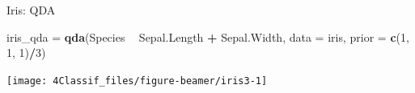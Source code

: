 \documentclass[10pt,ignorenonframetext,]{beamer}
\newenvironment{Shaded}{\begin{snugshade}}{\end{snugshade}}
\newcommand{\KeywordTok}[1]{\textcolor[rgb]{0.13,0.29,0.53}{\textbf{#1}}}
\newcommand{\DataTypeTok}[1]{\textcolor[rgb]{0.13,0.29,0.53}{#1}}
\newcommand{\DecValTok}[1]{\textcolor[rgb]{0.00,0.00,0.81}{#1}}
\newcommand{\StringTok}[1]{\textcolor[rgb]{0.31,0.60,0.02}{#1}}
\newcommand{\OperatorTok}[1]{\textcolor[rgb]{0.81,0.36,0.00}{\textbf{#1}}}
\newcommand{\NormalTok}[1]{#1}
\begin{document}
\begin{frame}[fragile]

\begin{block}{Iris: QDA}

\scriptsize

\begin{Shaded}
\begin{Highlighting}[]
\NormalTok{iris_qda =}\StringTok{ }\KeywordTok{qda}\NormalTok{(Species }\OperatorTok{~}\StringTok{ }\NormalTok{Sepal.Length }\OperatorTok{+}\StringTok{ }\NormalTok{Sepal.Width, }\DataTypeTok{data =}\NormalTok{ iris, }\DataTypeTok{prior =} \KeywordTok{c}\NormalTok{(}\DecValTok{1}\NormalTok{, }
    \DecValTok{1}\NormalTok{, }\DecValTok{1}\NormalTok{)}\OperatorTok{/}\DecValTok{3}\NormalTok{)}
\end{Highlighting}
\end{Shaded}

\begin{center}\texttt{[image: 4Classif\_files/figure-beamer/iris3-1]} \end{center}

\end{block}

\end{frame}
\end{document}
